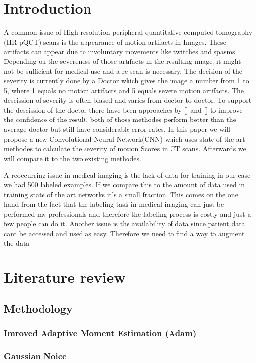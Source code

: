 \documentclass[acmsmall, review]{acmart}
\begin{document}
\section{Introduction}
	A common issue of High-resolution peripheral quantitative computed tomography (HR-pQCT) scans is the appearance of motion artifacts in Images. These artifacts can appear due to involuntary movements like twitches and spasms. Depending on the severeness of those artifacts in the resulting image, it might not be sufficient for medical use and a re scan is necessary. The decision of the severity is currently done by a Doctor which gives the image a number from 1 to 5, where 1 equals no motion artifacts and 5 equals severe motion artifacts. The descission of severity is often biased and varies from doctor to doctor. To support the descission of the doctor there have been approaches by [] and []  to improve the confidence of the result. both of those methodes perform better than the average doctor but still have considerable error rates. In this paper we will propose a new Convolutional Neural Network(CNN) which uses state of the art methodes to calculate the severity of motion Scores in CT scans. Afterwards we will compare it to the two existing methodes.
	
	A reoccurring issue in medical imaging is the lack of data for training in our case we had 500 labeled examples. If we compare this to the amount of data used in training state of the art networks it's a small fraction. This comes on the one hand from the fact that the labeling task in medical imaging can just be performed my professionals and therefore the labeling process is costly and just a few people can do it. Another issue is the availability of data since patient data cant be accessed and used as easy. Therefore we need to find a way to augment the data 
\section{Literature review}
\subsection{Methodology}
\subsubsection{Imroved Adaptive Moment Estimation (Adam)}
\subsubsection{Gaussian Noice}
\begin{comment}
adding annealed Gaussian noise to the gradien
-	surprisingly effective
-	experiments indicate that adding annealed Gaussian noise by decaying the variance works better than using fixed Gaussian noise
-	-adding n
-	-random restarts and the use of a momentum-based optimizer like Adam are not sufficient to achieve the best results in the absence of added gradient noiseoise to the gradient helps in achieving higher average and best accuracy	content...
\end{comment}
\end{document}
